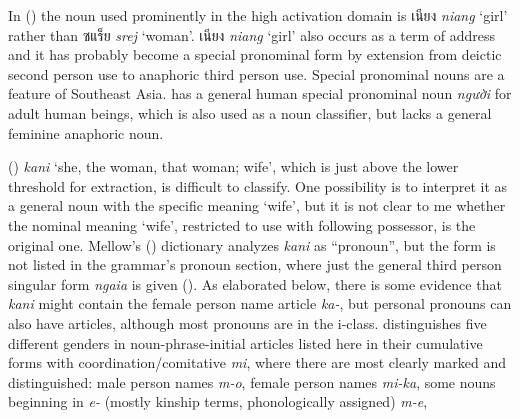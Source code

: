 \documentclass[output=collectionpaper]{langsci/langscibook}
\begin{document}
In  () the noun used prominently in the high activation domain is \textkhmer{เนียง}  \textit{niang} ‘girl’ rather than \textkhmer{ซแร็ย}  \textit{srej} ‘woman’. \textkhmer{เนียง }\textit{niang} ‘girl’ also occurs as a term of address and it has probably become a special pronominal form by extension from deictic second person use to anaphoric third person use. Special pronominal nouns are a feature of Southeast Asia.  has a general human special pronominal noun \textit{người} for adult human beings, which is also used as a noun classifier, but  lacks a general feminine anaphoric noun.

 () \textit{kani} ‘she, the woman, that woman; wife’, which is just above the lower threshold for extraction, is difficult to classify. One possibility is to interpret it as a general noun with the specific meaning ‘wife’, but it is not clear to me whether the nominal meaning ‘wife’, restricted to use with following possessor, is the original one. Mellow’s (\citeyear[273]{Mellow2013}) dictionary analyzes \textit{kani} as “pronoun”, but the form is not listed in the grammar’s pronoun section, where just the general third person singular form \textit{ngaia} is given (\citealt[7]{Mellow2013}). As elaborated below, there is some evidence that \textit{kani} might contain the female person name article \textit{ka-}, but personal pronouns can also have articles, although most pronouns are in the i-class.  distinguishes five different genders in noun-phrase-initial articles listed here in their cumulative forms with coordination/comitative \textit{mi}, where there are most clearly marked and distinguished: male person names \textit{m-o}, female person names \textit{mi-ka}, some nouns beginning in \textit{e-} (mostly kinship terms, phonologically assigned) \textit{m-e},
\end{document}
